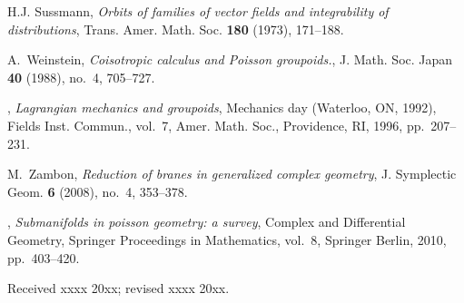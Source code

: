 \documentclass{amsart}
\theoremstyle{definition}
\begin{document}
\begin{thebibliography}{MMndDMn06}
H.J. Sussmann, \emph{Orbits of families of vector fields and integrability of
  distributions}, Trans. Amer. Math. Soc. \textbf{180} (1973), 171--188.

A.~Weinstein, \emph{{Coisotropic calculus and Poisson groupoids.}}, J. Math.
  Soc. Japan \textbf{40} (1988), no.~4, 705--727.

\bysame, \emph{Lagrangian mechanics and groupoids}, Mechanics day ({W}aterloo,
  {ON}, 1992), Fields Inst. Commun., vol.~7, Amer. Math. Soc., Providence, RI,
  1996, pp.~207--231.

M.~Zambon, \emph{Reduction of branes in generalized complex geometry}, J.
  Symplectic Geom. \textbf{6} (2008), no.~4, 353--378.

\bysame, \emph{Submanifolds in poisson geometry: a survey}, Complex and
  {D}ifferential {G}eometry, Springer {P}roceedings in {M}athematics, vol.~8,
  Springer Berlin, 2010, pp.~403--420.

\end{thebibliography}

\medskip
Received xxxx 20xx; revised xxxx 20xx.
\medskip
\end{document}
